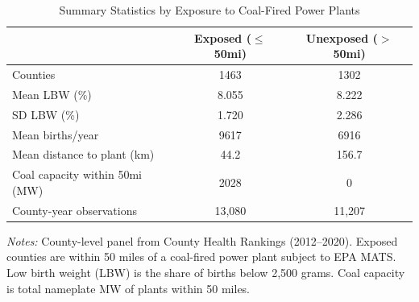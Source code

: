 \begin{table}[t]
\centering
\caption{Summary Statistics by Exposure to Coal-Fired Power Plants}
\label{tab:sumstats}
\begin{tabular}{lcc}
\toprule
 & Exposed ($\leq$50mi) & Unexposed ($>$50mi) \\
\midrule
Counties & 1463 & 1302 \\
Mean LBW (\%) & 8.055 & 8.222 \\
SD LBW (\%) & 1.720 & 2.286 \\
Mean births/year & 9617 & 6916 \\
Mean distance to plant (km) & 44.2 & 156.7 \\
Coal capacity within 50mi (MW) & 2028 & 0 \\
County-year observations & 13,080 & 11,207 \\
\bottomrule
\end{tabular}
\begin{tablenotes}
\item \textit{Notes:} County-level panel from County Health Rankings (2012--2020). Exposed counties are within 50 miles of a coal-fired power plant subject to EPA MATS. Low birth weight (LBW) is the share of births below 2,500 grams. Coal capacity is total nameplate MW of plants within 50 miles.
\end{tablenotes}
\end{table}

